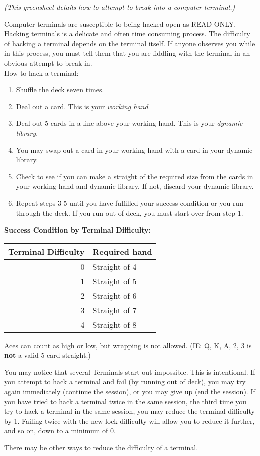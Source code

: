 \documentclass[green]{guildcamp4}
\begin{document}
\name{\gHacking{}}

\emph{(This greensheet details how to attempt to break into a computer terminal.)}

Computer terminals are susceptible to being hacked open as READ ONLY. Hacking terminals is a delicate and often time consuming process. The difficulty of hacking a terminal depends on the terminal itself. If anyone observes you while in this process, you must tell them that you are fiddling with the terminal in an obvious attempt to break in.\\

How to hack a terminal:
\begin{enumerate}
	\item Shuffle the deck seven times.
	\item Deal out a card. This is your {\em working hand}.
	\item Deal out 5 cards in a line above your working hand. This is your {\em dynamic library}.
	\item You may swap out a card in your working hand with a card in your dynamic library.
	\item Check to see if you can make a straight of the required size from the cards in your working hand and dynamic library. If not, discard your dynamic library.
	\item Repeat steps 3-5 until you have fulfilled your success condition or you run through the deck.  If you run out of deck, you must start over from step 1.
\end{enumerate}

{\bf Success Condition by Terminal Difficulty:}\\

\begin{tabular}{||r|l||}
	\hline\hline
	Terminal Difficulty	& Required hand\\
	\hline
	0	& Straight of 4\\
	1	& Straight of 5\\
	2	& Straight of 6\\
	3	& Straight of 7\\
	4	& Straight of 8\\
	\hline\hline 
\end{tabular}

\vspace{10 mm}

Aces can count as high or low, but wrapping is not allowed. (IE: Q, K, A, 2, 3 is {\bf not} a valid 5 card straight.)

You may notice that several Terminals start out impossible. This is intentional. If you attempt to hack a terminal and fail (by running out of deck), you may try again immediately (continue the session), or you may give up (end the session). If you have tried to hack a terminal twice in the same session, the third time you try to hack a terminal in the same session, you may reduce the terminal difficulty by 1. Failing twice with the new lock difficulty will allow you to reduce it further, and so on, down to a minimum of 0.

There may be other ways to reduce the difficulty of a terminal.
\end{document}
